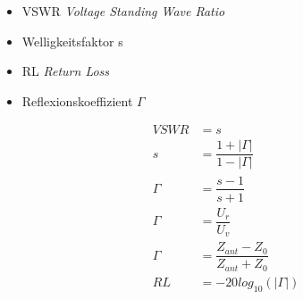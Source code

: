 \documentclass[10pt,a4paper]{report}
\author{Marcel Erismann}
\begin{document}
\begin{itemize}
\item VSWR \textit{Voltage Standing Wave Ratio} 
\item Welligkeitsfaktor s
\item RL \textit{Return Loss}
\item Reflexionskoeffizient $\Gamma$


\end{itemize}
\begin{align*}
VSWR &= s\\
s&=\dfrac{1+|\Gamma|}{1-|\Gamma|}\\
\Gamma &= \dfrac{s-1}{s+1}\\
\Gamma&=\dfrac{U_r}{U_v}\\ 
\Gamma &= \dfrac{Z_{ant}-Z_0}{Z_{ant}+Z_0}\\
RL&=-20log_{10}(|\Gamma|)\\
\end{align*}
\end{document}
